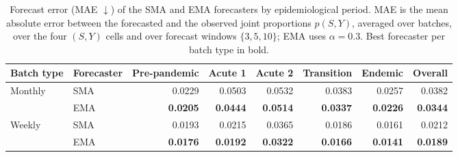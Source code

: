 \begin{table}
  \small
  \caption{Forecast error (MAE $\downarrow$) of the SMA and EMA forecasters by epidemiological period. MAE is the mean absolute error between the forecasted and the observed joint proportions $p(S,Y)$, averaged over batches, over the four $(S,Y)$ cells and over forecast windows $\{3,5,10\}$; EMA uses $\alpha=0.3$. Best forecaster per batch type in bold.}
  \label{tab:forecast-mae-period}
  \begin{tabular}{llrrrrrr}
    \toprule
    Batch type & Forecaster & Pre-pandemic & Acute 1 & Acute 2 & Transition & Endemic & Overall \\
    \midrule
    Monthly & SMA & 0.0229 & 0.0503 & 0.0532 & 0.0383 & 0.0257 & 0.0382 \\
     & EMA & \textbf{0.0205} & \textbf{0.0444} & \textbf{0.0514} & \textbf{0.0337} & \textbf{0.0226} & \textbf{0.0344} \\
    \midrule
    Weekly & SMA & 0.0193 & 0.0215 & 0.0365 & 0.0186 & 0.0161 & 0.0212 \\
     & EMA & \textbf{0.0176} & \textbf{0.0192} & \textbf{0.0322} & \textbf{0.0166} & \textbf{0.0141} & \textbf{0.0189} \\
    \bottomrule
  \end{tabular}
\end{table}
